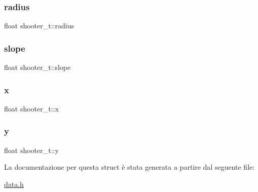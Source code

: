 \subsubsection{\texorpdfstring{radius}{radius}}
{\footnotesize\ttfamily float shooter\+\_\+t\+::radius}

\mbox{\label{structshooter__t_a958ea335a4ec8e592edb6ba8c927d511}} 
\subsubsection{\texorpdfstring{slope}{slope}}
{\footnotesize\ttfamily float shooter\+\_\+t\+::slope}

\mbox{\label{structshooter__t_aede1685d00f485e9f0ed40279f3d147e}} 
\subsubsection{\texorpdfstring{x}{x}}
{\footnotesize\ttfamily float shooter\+\_\+t\+::x}

\mbox{\label{structshooter__t_adb6e42adc6b761f77c23208379a77711}} 
\subsubsection{\texorpdfstring{y}{y}}
{\footnotesize\ttfamily float shooter\+\_\+t\+::y}



La documentazione per questa struct è stata generata a partire dal seguente file\+:\begin{DoxyCompactItemize}
\item 
\hyperlink{data_8h}{data.\+h}\end{DoxyCompactItemize}
